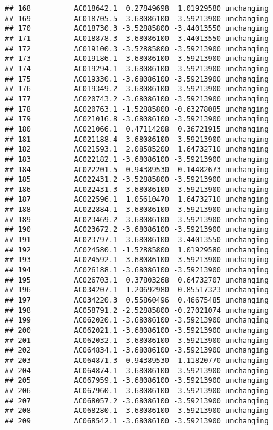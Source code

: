 \documentclass[]{article}
\begin{document}
\begin{verbatim}
## 168          AC018642.1  0.27849698  1.01929580 unchanging
## 169          AC018705.5 -3.68086100 -3.59213900 unchanging
## 170          AC018730.3 -3.52885800 -3.44013550 unchanging
## 171          AC018878.3 -3.68086100 -3.44013550 unchanging
## 172          AC019100.3 -3.52885800 -3.59213900 unchanging
## 173          AC019186.1 -3.68086100 -3.59213900 unchanging
## 174          AC019294.1 -3.68086100 -3.59213900 unchanging
## 175          AC019330.1 -3.68086100 -3.59213900 unchanging
## 176          AC019349.2 -3.68086100 -3.59213900 unchanging
## 177          AC020743.2 -3.68086100 -3.59213900 unchanging
## 178          AC020763.1 -1.52885800 -0.63278085 unchanging
## 179          AC021016.8 -3.68086100 -3.59213900 unchanging
## 180          AC021066.1  0.47114208  0.36721915 unchanging
## 181          AC021188.4 -3.68086100 -3.59213900 unchanging
## 182          AC021593.1  2.08585200  1.64732710 unchanging
## 183          AC022182.1 -3.68086100 -3.59213900 unchanging
## 184          AC022201.5 -0.94389530  0.14482673 unchanging
## 185          AC022431.2 -3.52885800 -3.59213900 unchanging
## 186          AC022431.3 -3.68086100 -3.59213900 unchanging
## 187          AC022596.1  1.05610470  1.64732710 unchanging
## 188          AC022884.1 -3.68086100 -3.59213900 unchanging
## 189          AC023469.2 -3.68086100 -3.59213900 unchanging
## 190          AC023672.2 -3.68086100 -3.59213900 unchanging
## 191          AC023797.1 -3.68086100 -3.44013550 unchanging
## 192          AC024580.1 -1.52885800  1.01929580 unchanging
## 193          AC024592.1 -3.68086100 -3.59213900 unchanging
## 194          AC026188.1 -3.68086100 -3.59213900 unchanging
## 195          AC026703.1  0.37803268  0.64732707 unchanging
## 196          AC034207.1 -1.20692980 -0.85517323 unchanging
## 197          AC034220.3  0.55860496  0.46675485 unchanging
## 198          AC058791.2 -2.52885800 -0.27021074 unchanging
## 199          AC062020.1 -3.68086100 -3.59213900 unchanging
## 200          AC062021.1 -3.68086100 -3.59213900 unchanging
## 201          AC062032.1 -3.68086100 -3.59213900 unchanging
## 202          AC064834.1 -3.68086100 -3.59213900 unchanging
## 203          AC064871.3 -0.94389530 -1.11820770 unchanging
## 204          AC064874.1 -3.68086100 -3.59213900 unchanging
## 205          AC067959.1 -3.68086100 -3.59213900 unchanging
## 206          AC067960.1 -3.68086100 -3.59213900 unchanging
## 207          AC068057.2 -3.68086100 -3.59213900 unchanging
## 208          AC068280.1 -3.68086100 -3.59213900 unchanging
## 209          AC068542.1 -3.68086100 -3.59213900 unchanging

\end{verbatim}
\end{document}
